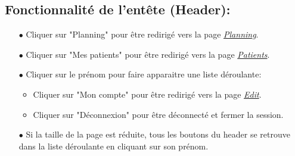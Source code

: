 \documentclass[a4paper]{report}
\begin{document}
\subsection{Fonctionnalité de l'entête (Header):}\label{header2}
    \begin{itemize}
        \item[$\bullet$] Cliquer sur "Planning" pour être redirigé vers la page \textit{\hyperref[planning]{Planning}}.
        \item[$\bullet$] Cliquer sur "Mes patients" pour être redirigé vers la page \textit{\hyperref[patients]{Patients}}.
        \item[$\bullet$] Cliquer sur le prénom pour faire apparaitre une liste déroulante:
            \begin{itemize}
                \item Cliquer sur "Mon compte" pour être redirigé vers la page \textit{\hyperref[edit2]{Edit}}.
                \item Cliquer sur "Déconnexion" pour être déconnecté et fermer la session.
            \end{itemize}
        \item[$\bullet$] Si la taille de la page est réduite, tous les boutons du header se retrouve dans la liste déroulante en cliquant sur son prénom.
    \end{itemize}
    \vspace{3mm}
    
\end{document}
